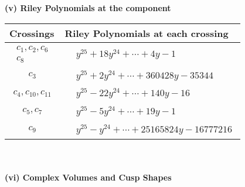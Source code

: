 \documentclass[1p]{elsarticle_modified}
\theoremstyle{definition}
\begin{document}
\newpage\renewcommand{\arraystretch}{1}
\flushleft \textbf{(v) Riley Polynomials at the component}\newline \\
\begin{tabular}{m{50pt}|m{274pt}}
Crossings & \hspace{64pt}Riley Polynomials at each crossing \\
\hline $$\begin{aligned}c_{1},c_{2},c_{6}\\c_{8}\end{aligned}$$&$\begin{aligned}
&y^{25}+18 y^{24}+\cdots+4 y-1
\end{aligned}$\\
\hline $$\begin{aligned}c_{3}\end{aligned}$$&$\begin{aligned}
&y^{25}+2 y^{24}+\cdots+360428 y-35344
\end{aligned}$\\
\hline $$\begin{aligned}c_{4},c_{10},c_{11}\end{aligned}$$&$\begin{aligned}
&y^{25}-22 y^{24}+\cdots+140 y-16
\end{aligned}$\\
\hline $$\begin{aligned}c_{5},c_{7}\end{aligned}$$&$\begin{aligned}
&y^{25}-5 y^{24}+\cdots+19 y-1
\end{aligned}$\\
\hline $$\begin{aligned}c_{9}\end{aligned}$$&$\begin{aligned}
&y^{25}- y^{24}+\cdots+25165824 y-16777216
\end{aligned}$\\
\hline
\end{tabular}\\~\\
\newpage\flushleft \textbf{(vi) Complex Volumes and Cusp Shapes}
\end{document}
